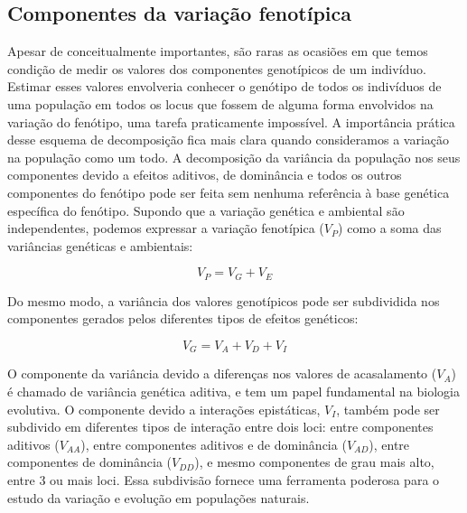\begin{refsection}
\subsection{Componentes da variação fenotípica}

Apesar de conceitualmente importantes, são raras as ocasiões em que temos
condição de medir os valores dos componentes genotípicos de um indivíduo. Estimar
esses valores envolveria conhecer o genótipo de todos os indivíduos de uma
população em todos os locus que fossem de alguma forma envolvidos na variação
do fenótipo, uma tarefa praticamente impossível. A importância
prática desse esquema de decomposição fica mais clara quando consideramos a
variação na população como um todo. A decomposição da variância da população nos
seus componentes devido a efeitos aditivos, de dominância e todos os outros
componentes do fenótipo pode ser feita sem nenhuma referência à base genética
específica do fenótipo. Supondo que a variação genética e ambiental são
independentes, podemos expressar a variação fenotípica ($V_P$) como a soma das
variâncias genéticas e ambientais:

\begin{equation}
V_P = V_G + V_E
\end{equation}

Do mesmo modo, a variância dos valores genotípicos pode ser subdividida nos
componentes gerados pelos diferentes tipos de efeitos genéticos:

\begin{equation}
V_G = V_A + V_D + V_I
\end{equation}

O componente da variância devido a diferenças nos valores de acasalamento
($V_A$) é chamado de variância genética aditiva, e tem um papel fundamental na
biologia evolutiva. O componente devido a interações epistáticas, $V_I$,
também pode ser subdivido em diferentes tipos de interação entre dois loci:
entre componentes aditivos ($V_{AA}$), entre componentes aditivos e de
dominância ($V_{AD}$), entre componentes de dominância ($V_{DD}$), e mesmo
componentes de grau mais alto, entre 3 ou mais loci. Essa subdivisão fornece
uma ferramenta poderosa para o estudo da variação e evolução em populações
naturais.


\end{refsection}
